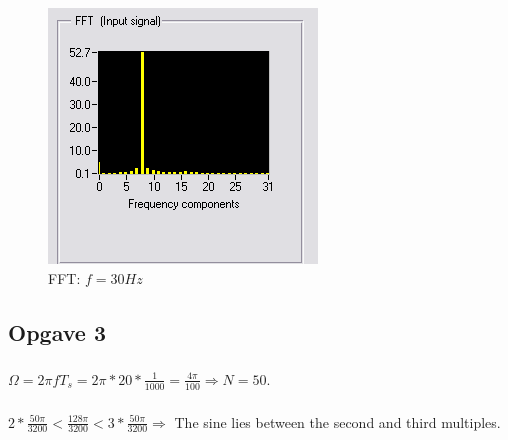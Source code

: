 \documentclass[a4paper, 12pt, titlepage]{article}
\begin{document}
\begin{figure}[H]
\includegraphics[scale=0.7]{2FFT30hz.png}
\caption{FFT: $f=30Hz$}
\end{figure}
\subsection{Opgave 3}
\subsubsection{}
$ \Omega = 2 \pi f T_s = 2 \pi * 20 * \frac{1}{1000} = \frac{4\pi}{100}
\Rightarrow N = 50$.
\subsubsection{}
$2 * \frac{50\pi}{3200} < \frac{128 \pi}{3200} < 3 *
\frac{50\pi}{3200}\Rightarrow$ The
sine lies between the second and third multiples.
\end{document}
